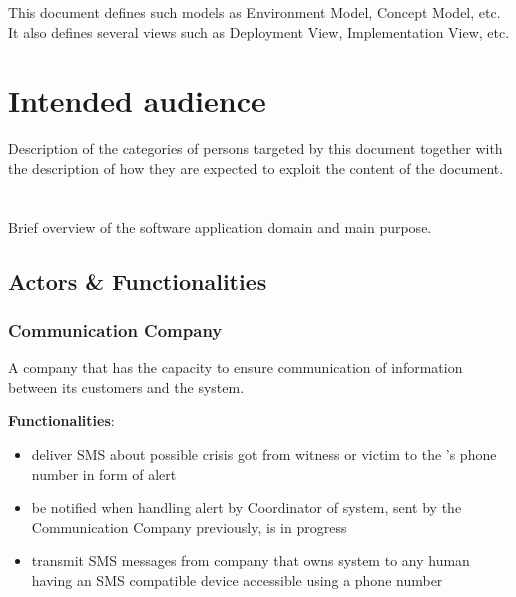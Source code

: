 This document defines such models as \gls{Environment
Model}, \gls{Concept Model}, etc. It also defines several views such as
\gls{Deployment View}, \gls{Implementation View}, etc.



\section{Intended audience}
Description of the categories of persons targeted by this document together with the description of how they are expected to exploit the content of the document.


\section{\mysystemname}
Brief overview of the software application domain and main purpose.


\subsection{Actors \& Functionalities}


\subsubsection{Communication Company}
A company that has the capacity to ensure communication of information between
its customers and the \mysystemname system. 

\textbf{Functionalities}:

\begin{itemize}
  \item deliver SMS about possible crisis got from witness or victim to the
  \mysystemname's phone number in form of alert
  \item be notified when handling alert by Coordinator of \mysystemname system,
  sent by the Communication Company previously, is in progress
  \item transmit SMS messages from company that owns \mysystemname system to any
  human having an SMS compatible device accessible using a phone number
\end{itemize}


